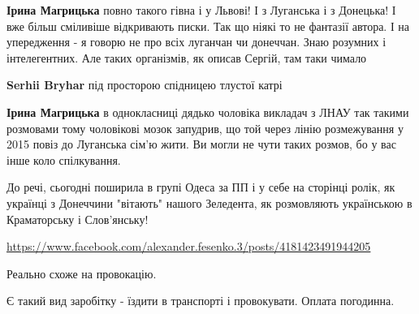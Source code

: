 \begin{itemize}
\begin{itemize}
\textbf{Ірина Магрицька} повно такого гівна і у Львові! І з Луганська і з Донецька! І вже більш сміливіше відкривають писки. Так що ніякі то не фантазії автора. І на упередження - я говорю не про всіх луганчан чи донеччан. Знаю розумних і інтелегентних. Але таких організмів, як описав Сергій, там таки чимало

 
\textbf{Serhii Bryhar} під просторою спідницею тлустої катрі

 
\textbf{Ірина Магрицька} в однокласниці дядько чоловіка викладач з ЛНАУ так
такими розмовами тому чоловікові мозок запудрив, що той через лінію
розмежування у 2015 повіз до Луганська сім'ю жити. Ви могли не чути таких
розмов, бо у вас інше коло спілкування.

\end{itemize}

 

До речі, сьогодні поширила в групі Одеса за ПП і у себе на сторінці ролік, як
українці з Донеччини "вітають" нашого Зеледента, як розмовляють українською в
Краматорську і Слов'янську!

\url{https://www.facebook.com/alexander.fesenko.3/posts/4181423491944205}

 

Реально схоже на провокацію.

Є такий вид заробітку - їздити в транспорті і провокувати. Оплата погодинна.

\begin{itemize}
 

\end{itemize}
\end{itemize}
